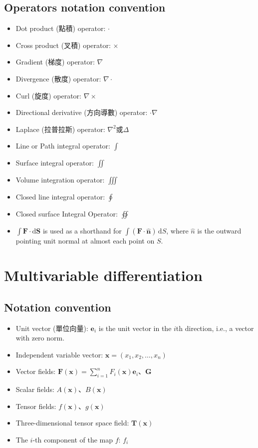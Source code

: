 \documentclass[a4paper,12pt]{report}
\begin{document}
\subsection{Operators notation convention}
\begin{itemize}
\item Dot product (點積) operator: $\cdot$
\item Cross product (叉積) operator: $\times$
\item Gradient (梯度) operator: $\nabla$
\item Divergence (散度) operator: $\nabla \cdot$
\item Curl (旋度) operator: $\nabla \times$
\item Directional derivative (方向導數) operator: $\cdot\nabla$
\item Laplace (拉普拉斯) operator: $\nabla^2$或$\Delta$
\item Line or Path integral operator: $\int$
\item Surface integral operator: $\iint$
\item Volume integration operator: $\iiint$
\item Closed line integral operator: $\oint$
\item Closed surface Integral Operator: $\oiint$
\item $\int\mathbf{F}\cdot\mathrm{d}\mathbf{S}$ is used as a shorthand for $\int(\mathbf{F}\cdot\mathbf{\hat{n}})\,\mathrm{d}S$, where $\hat{n}$ is the outward pointing unit normal at almost each point on $S$.
\end{itemize}



\section{Multivariable differentiation}
\subsection{Notation convention}
\begin{itemize}
\item Unit vector (單位向量): $\mathbf{e}_i$ is the unit vector in the $i$th direction, i.e., a vector with zero norm.
\item Independent variable vector: $\mathbf{x}=(x_1,x_2,\dots,x_n)$
\item Vector fields: $\mathbf{F}(\mathbf{x}) = \sum_{i=1}^n F_i(\mathbf{x}) \mathbf{e}_i$、$\mathbf{G}$
\item Scalar fields: $A(\mathbf{x})$、$B(\mathbf{x})$
\item Tensor fields: $f(\mathbf{x})$、$g(\mathbf{x})$
\item Three-dimensional tensor space field: $\mathbf{T}(\mathbf{x})$
\item The $i$-th component of the map $f$: $f_i$
\end{itemize}
\end{document}
